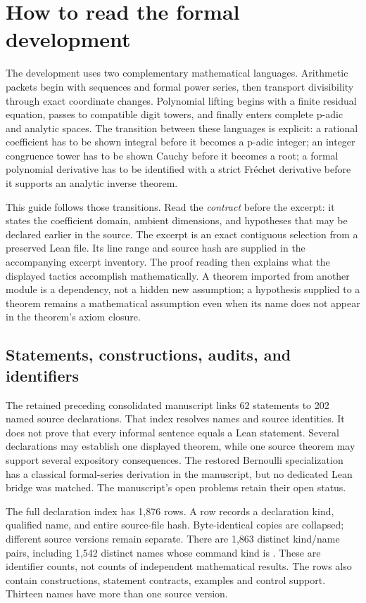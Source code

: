 \section{How to read the formal development}\label{sec:reading}
The development uses two complementary mathematical languages. Arithmetic packets begin with sequences and formal power series, then transport divisibility through exact coordinate changes. Polynomial lifting begins with a finite residual equation, passes to compatible digit towers, and finally enters complete p-adic and analytic spaces. The transition between these languages is explicit: a rational coefficient has to be shown integral before it becomes a p-adic integer; an integer congruence tower has to be shown Cauchy before it becomes a root; a formal polynomial derivative has to be identified with a strict Fr\'echet derivative before it supports an analytic inverse theorem.

This guide follows those transitions. Read the \emph{contract} before the excerpt: it states the coefficient domain, ambient dimensions, and hypotheses that may be declared earlier in the source. The excerpt is an exact contiguous selection from a preserved Lean file. Its line range and source hash are supplied in the accompanying excerpt inventory. The proof reading then explains what the displayed tactics accomplish mathematically. A theorem imported from another module is a dependency, not a hidden new assumption; a hypothesis supplied to a theorem remains a mathematical assumption even when its name does not appear in the theorem's axiom closure.

\subsection{Statements, constructions, audits, and identifiers}
The retained preceding consolidated manuscript links 62 statements to 202 named source declarations. That index resolves names and source identities. It does not prove that every informal sentence equals a Lean statement. Several declarations may establish one displayed theorem, while one source theorem may support several expository consequences. The restored Bernoulli specialization has a classical formal-series derivation in the manuscript, but no dedicated Lean bridge was matched. The manuscript's open problems retain their open status.

The full declaration index has 1,876 rows. A row records a declaration kind, qualified name, and entire source-file hash. Byte-identical copies are collapsed; different source versions remain separate. There are 1,863 distinct kind/name pairs, including 1,542 distinct names whose command kind is . These are identifier counts, not counts of independent mathematical results. The rows also contain constructions, statement contracts, examples and control support. Thirteen names have more than one source version.


